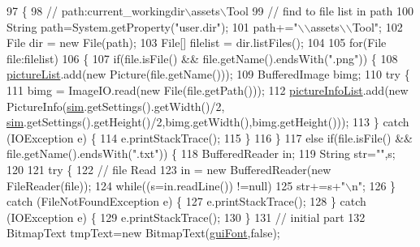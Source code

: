 \begin{DoxyCode}
97   \{
98     \textcolor{comment}{// path:current\_workingdir\(\backslash\)assets\(\backslash\)Tool}
99     \textcolor{comment}{// find to file list in path }
100     String path=System.getProperty(\textcolor{stringliteral}{"user.dir"});
101     path+=\textcolor{stringliteral}{"\(\backslash\)\(\backslash\)assets\(\backslash\)\(\backslash\)Tool"};
102     File dir = \textcolor{keyword}{new} File(path);
103     File[] filelist = dir.listFiles();
104     
105     \textcolor{keywordflow}{for}(File file:filelist)
106     \{
107       \textcolor{keywordflow}{if}(file.isFile() && file.getName().endsWith(\textcolor{stringliteral}{".png"})) \{
108         \hyperlink{classkr_1_1ac_1_1kookmin_1_1cs_1_1tool_1_1_hud_layout_tool_acbd0f26c3534561b74d5f3b75ae4d622}{pictureList}.add(\textcolor{keyword}{new} Picture(file.getName()));
109         BufferedImage bimg;
110         \textcolor{keywordflow}{try} \{
111           bimg = ImageIO.read(\textcolor{keyword}{new} File(file.getPath()));
112           \hyperlink{classkr_1_1ac_1_1kookmin_1_1cs_1_1tool_1_1_hud_layout_tool_a8deeda5173478bb396d5eafd48eb5f6f}{pictureInfoList}.add(\textcolor{keyword}{new} PictureInfo(\hyperlink{classkr_1_1ac_1_1kookmin_1_1cs_1_1tool_1_1_hud_layout_tool_af06a05d18241dcbe2bc4f2c96d157ee0}{sim}.getSettings().getWidth()/2, 
      \hyperlink{classkr_1_1ac_1_1kookmin_1_1cs_1_1tool_1_1_hud_layout_tool_af06a05d18241dcbe2bc4f2c96d157ee0}{sim}.getSettings().getHeight()/2,bimg.getWidth(),bimg.getHeight()));
113         \} \textcolor{keywordflow}{catch} (IOException e) \{
114           e.printStackTrace();
115         \}
116       \}
117       \textcolor{keywordflow}{else} \textcolor{keywordflow}{if}(file.isFile() && file.getName().endsWith(\textcolor{stringliteral}{".txt"})) \{
118         BufferedReader in;
119         String str=\textcolor{stringliteral}{""},s;
120         
121         \textcolor{keywordflow}{try} \{
122           \textcolor{comment}{// file Read}
123           in = \textcolor{keyword}{new} BufferedReader(\textcolor{keyword}{new} FileReader(file));
124           \textcolor{keywordflow}{while}((s=in.readLine()) !=null)
125             str+=s+\textcolor{stringliteral}{"\(\backslash\)n"};
126         \} \textcolor{keywordflow}{catch} (FileNotFoundException e) \{
127           e.printStackTrace();
128         \} \textcolor{keywordflow}{catch} (IOException e) \{
129           e.printStackTrace();
130         \}
131         \textcolor{comment}{// initial part}
132         BitmapText tmpText=\textcolor{keyword}{new} BitmapText(\hyperlink{classkr_1_1ac_1_1kookmin_1_1cs_1_1tool_1_1_hud_layout_tool_a92b0ab831e8b62aaebc0974947958349}{guiFont},\textcolor{keyword}{false});

\end{DoxyCode}
